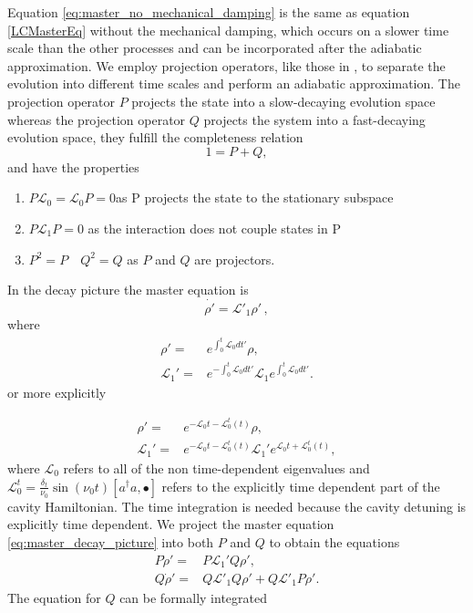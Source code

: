 \documentclass[reprint, amsmath,amssymb, aps,pra]{revtex4-1}
\begin{document}
Equation \eqref{eq:master_no_mechanical_damping} is the same as
equation \eqref{LCMasterEq} without the mechanical damping, which
occurs on a slower time scale than the other processes and can be
incorporated after the adiabatic approximation. We employ projection
operators, like those in \cite{CarmichaelQO}, to separate the
evolution into different time scales and perform an adiabatic
approximation. The projection operator $P$ projects the state into a
slow-decaying evolution space whereas the projection operator $Q$
projects the system into a fast-decaying evolution space, they fulfill
the completeness relation
\begin{equation}
1 = P + Q,
\end{equation}
and have the properties
\begin{enumerate}

\item $ P\mathcal{L}_{0} = \mathcal{L}_{0}P = 0 $\qquad as P projects the state to the stationary subspace
\item $P\mathcal{L}_{1}P=0$ \qquad as the interaction does not couple states in P

\item $P^2 = P \quad Q^2 = Q$ \qquad as $P$ and $Q$ are projectors.
\end{enumerate}
In the decay picture the master equation is 
\begin{equation}
  \label{eq:master_decay_picture}
    \dot{\rho'} = \mathcal{L}'_1\rho'\, ,
\end{equation}
where
\begin{align*}
 \rho' =& e^{\int_0^t \mathcal{L}_0 dt'}\rho,\\
  \mathcal{L}_1' =& e^{-\int_0^t \mathcal{L}_0 dt'}\mathcal{L}_1e^{\int_0^t \mathcal{L}_0 dt'}.
\end{align*} or more explicitly

\begin{align}
\rho' =& e^{-\mathcal{L}_0t - \mathcal{L}_0^t(t)}\rho,\\
\mathcal{L}_1' =&e^{-\mathcal{L}_0t - \mathcal{L}_0^t(t)}\mathcal{L}_1' e^{\mathcal{L}_0t +\mathcal{L}_0^t(t)},
\end{align} where $\mathcal{L}_0$ refers to all of the non time-dependent eigenvalues and $\mathcal{L}_0^t=\frac{\delta_t}{\nu_0} \sin(\nu_0t)[a^\dagger a,\bullet]$ refers to the explicitly time dependent part of the cavity Hamiltonian.  The time integration is needed because the cavity detuning is explicitly time dependent. We project the master equation \eqref{eq:master_decay_picture} into
both $P$ and $Q$ to obtain the equations 
\begin{align*}
P\dot{\rho}' =& P\mathcal{L}_1'Q\rho', \\
Q\dot{\rho}' =& Q\mathcal{L}'_1Q\rho' + Q\mathcal{L}'_1P\rho'.
\end{align*} The equation for $Q$ can be formally integrated
\end{document}
